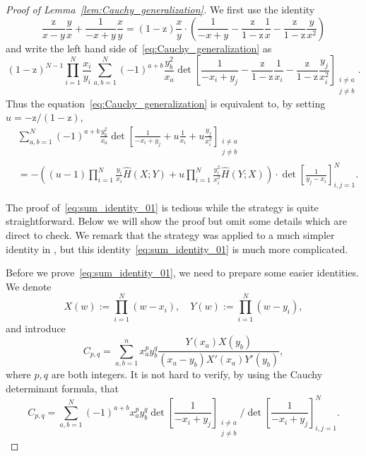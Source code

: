 \documentclass[10pt,a4paper]{amsart}
\newcommand{\rz}{\mathrm{z}}
\begin{document}
\begin{proof}[Proof of Lemma~\ref{lem:Cauchy_generalization}]
	We first use the identity
	\begin{equation*}
		\frac{\rz}{ x-y} \frac{y}{x}
		+\frac{1}{-x+y}\frac{x}{y} 
		=(1-\rz)\frac{x}{y}
		    \cdot\left(\frac{1}{-x+y} 
		              -\frac{\rz}{1-\rz}\frac{1}{x}
		              -\frac{\rz}{1-\rz}\frac{y}{x^2}
		         \right)
	\end{equation*}
and write the left hand side of~\eqref{eq:Cauchy_generalization} as
\begin{equation}
	(1-\rz)^{N-1}\prod_{i=1}^N\frac{x_i}{y_i} \sum_{a,b=1}^N(-1)^{a+b}\frac{y_b^2}{x_a}
	\det\left[\frac{1}{-x_i+y_j} 
	-\frac{\rz}{1-\rz}\frac{1}{x_i}
	-\frac{\rz}{1-\rz}\frac{y_j}{x_i^2}\right]_{\substack{i\ne a \\ j\ne b}}.
\end{equation}
Thus the equation~\eqref{eq:Cauchy_generalization} is equivalent to, by setting $u=-\rz/(1-\rz)$,
\begin{equation}
	\label{eq:sum_identity_01}
	\begin{split}
	&\sum_{a,b=1}^N (-1)^{a+b} \frac{y_b^2}{x_a} 
	       \det\left[  \frac{1}{-x_i+y_j} +u \frac{1}{x_i} +u \frac{y_j}{x_i^2} \right]_{\substack{i\ne a\\ j\ne b}}\\
	       &
	       = -\left(
	        (u-1)\prod_{i=1}^N \frac{y_i}{x_i} \hat H(X;Y)
	        + u \prod_{i=1}^N\frac{y_i^2}{x_i^2}\hat H(Y; X)
	       \right)\cdot \det\left[\frac{1}{y_j-x_i}\right]_{i,j=1}^N.
	       \end{split}
\end{equation}

The proof of~\eqref{eq:sum_identity_01} is tedious while the strategy is quite straightforward. Below we will show the proof but omit some details which are direct to check. We remark that the strategy was applied to a much simpler identity in \cite[Lemma 5.5]{Baik-Liu17}, but this identity~\eqref{eq:sum_identity_01} is much more complicated.

Before we prove~\eqref{eq:sum_identity_01}, we need to prepare some easier identities. We denote 
\begin{equation*}
	X(w):= \prod_{i=1}^N (w-x_i),\quad Y(w):= \prod_{i=1}^N (w-y_i),
\end{equation*}
and introduce
\begin{equation*}
	C_{p,q} = \sum_{a,b=1}^n x_a^py_b^q\frac{Y(x_a)X(y_b)}{(x_a-y_b)X'(x_a)Y'(y_b)},
\end{equation*}
where $p,q$ are both integers. It is not hard to verify, by using the Cauchy determinant formula, that
\begin{equation}
	\label{eq:C_ab_relation_Cauchy}
	C_{p,q} = \sum_{a,b=1}^N (-1)^{a+b} x_a^p y_b^q \det\left[\frac{1}{-x_i+y_j}\right]_{\substack{i\ne a\\ j\ne b}}
	/\det\left[\frac{1}{-x_i+y_j}\right]_{i,j=1}^N.
\end{equation}


\end{proof}
\end{document}
